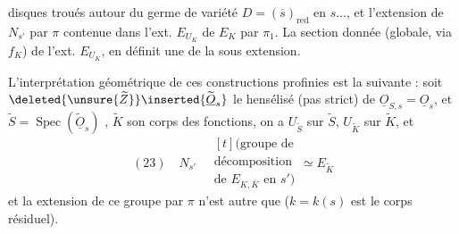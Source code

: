 disques troués autour du germe de
variété $D=(\overline s)_{\mathrm{red}}$ en $s\dots$, et l'extension
de $N_{s'}$ par $\pi$ contenue dans l'ext. $E_{U_K}$ de
$E_K$ par $\pi_1$.
La section donnée (globale,
 via $f_K$) de l'ext. $E_{U_K}$, en
définit une de la sous extension. 

L'interprétation géométrique de ces constructions
profinies est la suivante : soit
$\deleted{\unsure{\widetilde Z}}\inserted{\widetilde{\underline O}_s}$ le hensélisé (pas strict) de $\underline O_{S,s}=\underline O_s$,
et $\widetilde S=\operatorname{Spec}(\widetilde{\underline O}_s)$ , $\widetilde K$ son corps des
fonctions, on a $U_{\widetilde S}$ sur $\widetilde S$, $U_{\widetilde K}$ sur $\widetilde K$,
et 
\[
(23)\quad N_{s'}\quad
\begin{gathered}[t]
\text{(groupe de}\\
\text{décomposition}\\
\text{de }E_{K,\overline K}\text{ en }s')
\end{gathered}
\simeq E_{\widetilde K}
\]
et la  extension de ce groupe par $\pi$
n'est autre que
($k=k(s)$ est le corps résiduel).
